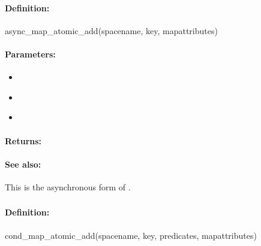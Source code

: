 \paragraph{Definition:}
\begin{rubycode}
async_map_atomic_add(spacename, key, mapattributes)
\end{rubycode}

\paragraph{Parameters:}
\begin{itemize}[noitemsep]
\item {}\\

\item {}\\

\item {}\\

\end{itemize}

\paragraph{Returns:}


\paragraph{See also:}  This is the asynchronous form of .

\pagebreak
\subsubsection{}
\label{api:ruby:cond_map_atomic_add}


\paragraph{Definition:}
\begin{rubycode}
cond_map_atomic_add(spacename, key, predicates, mapattributes)
\end{rubycode}

